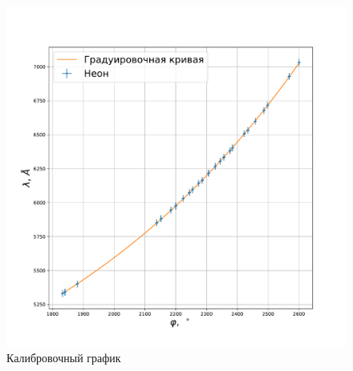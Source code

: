 \documentclass[a4paper, 12pt]{article}
\begin{document}
\begin{figure}[H]
    \includegraphics[scale = 0.35]{calib}
    \centering
    \caption{Калибровочный график}
    \label{img:calib}
\end{figure}
\end{document}
